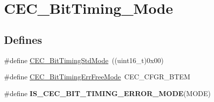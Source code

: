 \hypertarget{group__CEC__BitTiming__Mode}{
\section{CEC\_\-BitTiming\_\-Mode}
\label{group__CEC__BitTiming__Mode}
}
\subsection*{Defines}
\begin{DoxyCompactItemize}
\item 
\#define \hyperlink{group__CEC__BitTiming__Mode_gaf6866e5087bb01c1ea4e20a207a1f691}{CEC\_\-BitTimingStdMode}~((uint16\_\-t)0x00)
\item 
\#define \hyperlink{group__CEC__BitTiming__Mode_ga4fd44675c774985d1f6cd8976b18c947}{CEC\_\-BitTimingErrFreeMode}~CEC\_\-CFGR\_\-BTEM
\item 
\#define {\bfseries IS\_\-CEC\_\-BIT\_\-TIMING\_\-ERROR\_\-MODE}(MODE)
\end{DoxyCompactItemize}


